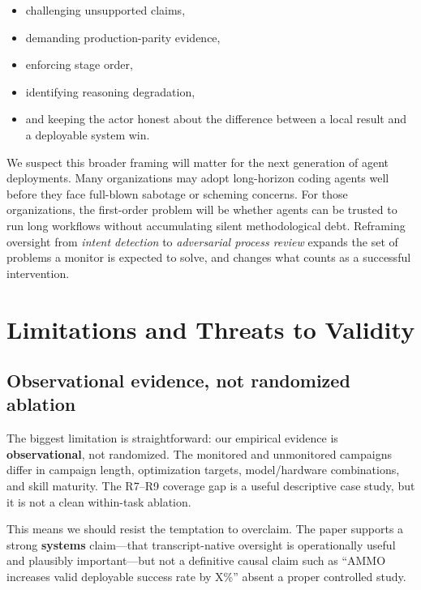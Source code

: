 \documentclass[11pt]{article}
\begin{document}
\begin{itemize}[leftmargin=*,itemsep=2pt]
  \item challenging unsupported claims,
  \item demanding production-parity evidence,
  \item enforcing stage order,
  \item identifying reasoning degradation,
  \item and keeping the actor honest about the difference between a local result and a deployable system win.
\end{itemize}

We suspect this broader framing will matter for the next generation of agent deployments. Many organizations may adopt long-horizon coding agents well before they face full-blown sabotage or scheming concerns. For those organizations, the first-order problem will be whether agents can be trusted to run long workflows without accumulating silent methodological debt. Reframing oversight from \emph{intent detection} to \emph{adversarial process review} expands the set of problems a monitor is expected to solve, and changes what counts as a successful intervention.

\section{Limitations and Threats to Validity}
\label{sec:limitations}

\subsection{Observational evidence, not randomized ablation}
\label{sec:observational}
\label{sec:obs-vs-rand}

The biggest limitation is straightforward: our empirical evidence is \textbf{observational}, not randomized. The monitored and unmonitored campaigns differ in campaign length, optimization targets, model/hardware combinations, and skill maturity. The R7--R9 coverage gap is a useful descriptive case study, but it is not a clean within-task ablation.

This means we should resist the temptation to overclaim. The paper supports a strong \textbf{systems} claim---that transcript-native oversight is operationally useful and plausibly important---but not a definitive causal claim such as ``AMMO increases valid deployable success rate by X\%'' absent a proper controlled study.
\end{document}
